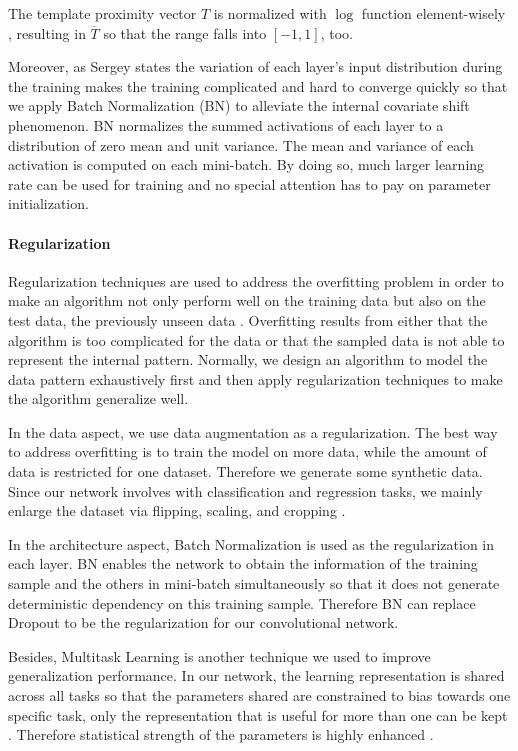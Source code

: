 The template proximity vector $T$  is normalized with $\log$ function element-wisely \cite{DBLP:journals/corr/ChabotCRTC17}, resulting in $\overline T$ so that the range falls into $[-1, 1]$, too.

Moreover, as Sergey \etal \cite{DBLP:journals/corr/IoffeS15}states the variation of each layer's input distribution during the training makes the training complicated and hard to converge quickly so that we apply Batch Normalization (BN) to alleviate the internal covariate shift phenomenon.  BN normalizes the summed activations of each layer to a distribution of zero mean and unit variance. The mean and variance of each activation is computed on each mini-batch. By doing so, much larger learning rate can be used for training and no special attention has to pay on parameter initialization. 
 
\paragraph{Regularization}
Regularization techniques are used to address the overfitting problem in order to make an algorithm not only perform well on the training data but also on the test data, the previously unseen data \cite{Goodfellow-et-al-2016}. Overfitting results from either that the algorithm is too complicated for the data or that the sampled data is not able to represent the internal pattern. Normally, we design an algorithm to model  the data pattern exhaustively first and then apply regularization techniques to make the algorithm generalize well.  

In the data aspect, we use data augmentation as a regularization. The best way to address overfitting is to train the model on more data, while the amount of data is restricted for one dataset. Therefore we generate some synthetic data. Since our network involves with classification and regression tasks, we mainly enlarge the dataset via flipping, scaling, and cropping \tbd. 

In the architecture aspect, Batch Normalization \cite{DBLP:journals/corr/IoffeS15} is used as the regularization in each layer. BN enables the network to obtain the information of the training sample and the others in mini-batch simultaneously so that it does not generate deterministic dependency on this training sample. Therefore BN can replace Dropout \cite{JMLR:v15:srivastava14a} to be the regularization for our convolutional network. 

Besides, Multitask Learning is another technique we used to improve generalization performance. 
In our network, the learning representation is shared across all tasks so that the parameters shared are constrained to bias towards one specific task, \ie only the representation that is useful for more than one can be kept \cite{Goodfellow-et-al-2016}.  Therefore statistical strength of the parameters is highly enhanced \cite{Baxter:1995:LIR:225298.225336}.

